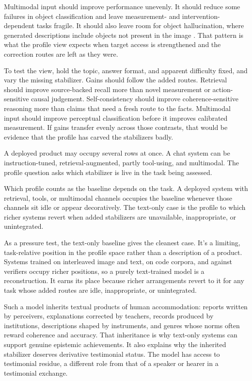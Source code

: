 \documentclass[12pt]{article}
\begin{document}
Multimodal input should improve performance unevenly. It should reduce some failures in
object classification and leave measurement- and intervention-dependent tasks fragile.
It should also leave room for object hallucination, where generated descriptions include
objects not present in the image
\citep{li_etal_2023_evaluating_object_hallucination_lvlms}. That pattern is what the
profile view expects when target access is strengthened and the correction routes are left
as they were.

To test the view, hold the topic, answer format, and apparent difficulty fixed, and vary
the missing stabilizer. Gains should follow the added routes. Retrieval should improve
source-backed recall more than novel measurement or action-sensitive causal judgement.
Self-consistency should improve coherence-sensitive reasoning more than claims that need
a fresh route to the facts. Multimodal input should improve perceptual classification
before it improves calibrated measurement. If gains transfer evenly across those
contrasts, that would be evidence that the profile has carved the stabilizers badly.

A deployed product may occupy several rows at once. A chat system can be
instruction-tuned, retrieval-augmented, partly tool-using, and multimodal. The profile
question asks which stabilizer is live in the task being assessed.

Which profile counts as the baseline depends on the task. A deployed system with
retrieval, tools, or multimodal channels occupies the baseline whenever those channels sit
idle or appear decoratively. The text-only case is the profile to which richer systems
revert when added stabilizers are unavailable, inappropriate, or unintegrated.

As a pressure test, the text-only baseline gives the cleanest case. It's a limiting, task-relative position in the profile
space rather than a description of a product. Systems trained on interleaved image and text,
on code corpora, and against verifiers occupy richer positions, so a purely text-trained
model is a reconstruction. It earns its place because richer arrangements revert to it for
any task whose added routes are idle, inappropriate, or unintegrated.

Such a model inherits
textual products of human accommodation: reports written by perceivers, explanations
corrected by teachers, records produced by institutions, descriptions shaped by
instruments, and genres whose norms often reward coherence and accuracy. That inheritance
is why text-only systems can support genuine epistemic achievements. It also explains why
the inherited stabilizer deserves derivative testimonial status. The model has access to
testimonial residue, a different role from that of a speaker or hearer in a testimonial
exchange.
\end{document}
